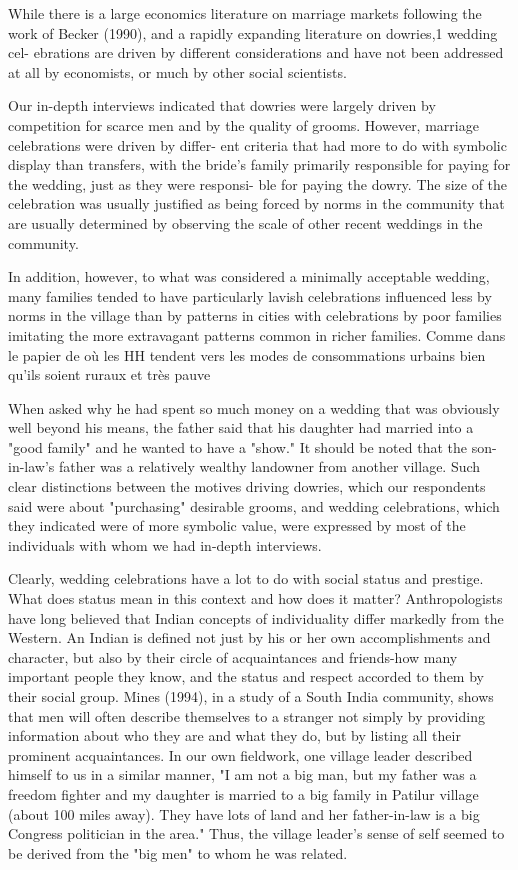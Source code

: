 \documentclass[a4paper, 11pt, onecolumn]{article}
\begin{document}
While there is a large economics literature on marriage markets following the
work of Becker (1990), and a rapidly expanding literature on dowries,1 wedding cel-
ebrations are driven by different considerations and have not been addressed at all by
economists, or much by other social scientists.

 Our in-depth
interviews indicated that dowries were largely driven by competition for scarce men
and by the quality of grooms. However, marriage celebrations were driven by differ-
ent criteria that had more to do with symbolic display than transfers, with the bride's
family primarily responsible for paying for the wedding, just as they were responsi-
ble for paying the dowry. The size of the celebration was usually justified as being
forced by norms in the community that are usually determined by observing the scale
of other recent weddings in the community.

In addition, however, to what was considered a minimally acceptable wedding,
many families tended to have particularly lavish celebrations influenced less by norms
in the village than by patterns in cities with celebrations by poor families imitating the
more extravagant patterns common in richer families. 
Comme dans le papier de \cite{Guerin2014a} où les HH tendent vers les modes de consommations urbains bien qu'ils soient ruraux et très pauve

When asked why he
had spent so much money on a wedding that was obviously well beyond his means, the
father said that his daughter had married into a "good family" and he wanted to have a
"show." It should be noted that the son-in-law's father was a relatively wealthy
landowner from another village. Such clear distinctions between the motives driving
dowries, which our respondents said were about "purchasing" desirable grooms, and
wedding celebrations, which they indicated were of more symbolic value, were
expressed by most of the individuals with whom we had in-depth interviews.

Clearly, wedding celebrations have a lot to do with social status and prestige. What
does status mean in this context and how does it matter? Anthropologists have long
believed that Indian concepts of individuality differ markedly from the Western. An
Indian is defined not just by his or her own accomplishments and character, but also
by their circle of acquaintances and friends-how many important people they know,
and the status and respect accorded to them by their social group. Mines (1994), in a
study of a South India community, shows that men will often describe themselves to
a stranger not simply by providing information about who they are and what they do,
but by listing all their prominent acquaintances. In our own fieldwork, one village
leader described himself to us in a similar manner, "I am not a big man, but my father
was a freedom fighter and my daughter is married to a big family in Patilur village
(about 100 miles away). They have lots of land and her father-in-law is a big Congress
politician in the area." Thus, the village leader's sense of self seemed to be derived
from the "big men" to whom he was related.
\end{document}
